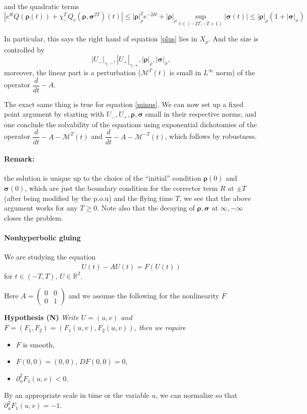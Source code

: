 \documentclass[letterpaper,11pt]{article}
\newcommand{\R}{\mathbb{R}}
\newcommand{\Rho}{\bm{\rho}}
\newcommand{\bigma}{\bm{\sigma}}
\numberwithin{equation}{section}
\newenvironment{Hypothesis}[1]%
  {\begin{trivlist}\item[]{\bf Hypothesis #1 }\em}{\end{trivlist}}
\theoremstyle{plain}
\begin{document}
and the quadratic terms
\[
\left| e^{\delta t}Q(\Rho(t))+\chi_-^TQ_c(\Rho,\bigma^{2T})(t) \right| \le |\Rho|_{\rho}^2e^{-2\delta t} + |\Rho|_\rho \sup_{t \in (-2T,-T+1)} |\bigma(t)| \le |\Rho|_{\rho}(1 +| \bigma|_{\sigma})
\]

In particular, this says the right hand of equation \eqref{plus} lies in $X_\rho$. And the size is controlled by 
\[|U_-|_{\gamma,-}, |U_+|_{\gamma,+}, |\Rho|_{\rho}, |\bigma|_{\sigma},
\]
moreover, the linear part is a perturbation ($\mathcal{M}^T(t)$ is small in $L^{\infty}$ norm) of the operator $\dfrac{d}{dt}-A$. 

The exact same thing is true for equation \eqref{minus}. We can now set up a fixed point argument by starting with $U_-, U_+, \Rho, \bigma$ small in their respective norms, and one conclude the solvability of the equations using exponential dichotomies of the operator $\dfrac{d}{dt}-A-\mathcal{M}^T(t)$ and $\dfrac{d}{dt}-A-\mathcal{M}^{-T}(t)$, which follows by robustness.

\paragraph{Remark:} the solution is unique up to the choice of the ``initial'' condition $\Rho(0)$ and $\bigma(0)$, which are just the boundary condition for the corrector term $R$ at $\pm T$ (after being modified by the p.o.u) and the flying time $T$, we see that the above argument works for any $T\ge 0$. Note also that the decaying of $\Rho, \bigma$ at $\infty, -\infty$ closes the problem.




\pagebreak
\paragraph{Nonhyperbolic gluing}

We are studying the equation
\begin{equation}\label{Shl}
\dot{U}(t)-AU(t) = F(U(t))
\end{equation}
for $t \in (-T,T)$, $U \in \R^2$.

Here $A = \begin{pmatrix}
0&0\\
0&1
\end{pmatrix}$ and we assume the following for the nonlinearity $F$ 
\begin{Hypothesis} {(N)}
Write $U=(u,v)$ and $F = (F_1,F_2)=(F_1(u,v),F_2(u,v))$, then we require
\begin{itemize}
\item $F$ is smooth,
\item $F(0,0) = (0,0)$, $DF(0,0) = 0$, 
\item  $\partial_u^2 F_1(u,v) < 0$.
\end{itemize}
\end{Hypothesis}
By an appropriate scale in time or the variable $u$, we can normalize so that $\partial_u^2 F_1(u,v) = -1$.
\end{document}
